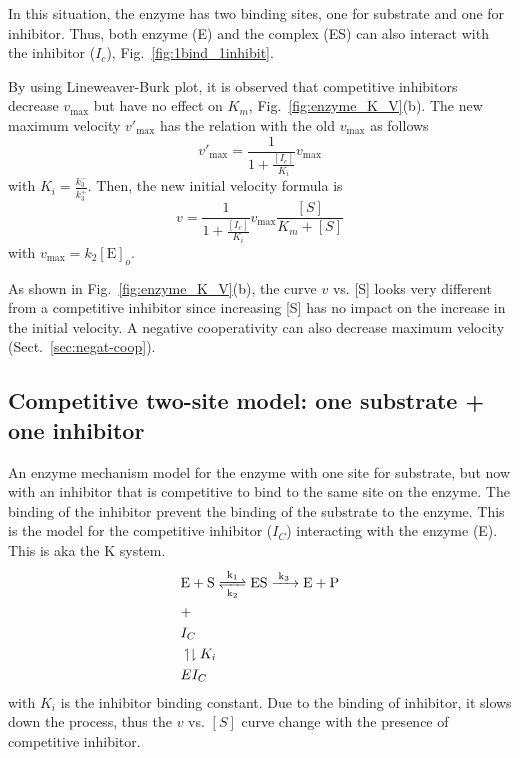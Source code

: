 In this situation, the enzyme has two binding sites, one for substrate
and one for inhibitor. Thus, both enzyme (E) and the complex (ES) can
also interact with the inhibitor ($I_c$),
Fig.~\ref{fig:1bind_1inhibit}. 

By using Lineweaver-Burk plot, it is observed that competitive
inhibitors decrease $v_\max$ but have no effect on $K_m$,
Fig.~\ref{fig:enzyme_K_V}(b). The new maximum velocity $v'_\max$ has
the relation with the old $v_\max$ as follows
\begin{equation}
  \label{eq:326}
  v'_\max = \frac{1}{1+\frac{[I_c]}{K_i}} v_\max
\end{equation}
with $K_i=\frac{k^-_3}{k^+_3}$.  Then, the new initial velocity
formula is
\begin{equation}
  \label{eq:327}
  v = \frac{1}{1+\frac{[I_c]}{K_i}} v_\max \frac{[S]}{K_m+[S]}
\end{equation}
with $v_\max = k_2[\text{E}]_o$.

As shown in Fig.~\ref{fig:enzyme_K_V}(b), the curve $v$ vs. [S]
looks very different from a competitive inhibitor since increasing [S]
has no impact on the increase in the initial velocity. A negative
cooperativity can also decrease maximum velocity
(Sect.~\ref{sec:negat-coop}).

\subsection[Competitive two-site model]{Competitive two-site model: one substrate + one inhibitor}
\label{sec:competitive-two-site}

An enzyme mechanism model for the enzyme with one site for substrate,
but now with an inhibitor that is competitive to bind to the same
site on the enzyme. The binding of the inhibitor prevent the binding
of the substrate to the enzyme. This is the model for the competitive
inhibitor ($I_C$) interacting with the enzyme (E). This is aka the K
system. 
\begin{equation}
  \label{eq:323}
  \begin{split}
    &\ce{E  + S <=>[k_1][k_2] ES ->[k_3] E + P} \\
    &+ \\
    &I_C \\
    &\upharpoonleft\downharpoonright K_i \\
    & EI_C
  \end{split}
\end{equation}
with $K_i$ is the inhibitor binding constant.
Due to the binding of inhibitor, it slows down the process, thus the
$v$ vs. $[S]$ curve change with the presence of competitive
inhibitor. 

